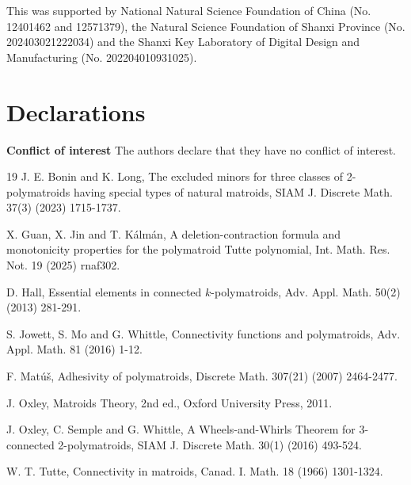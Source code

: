 \documentclass[preprint,10pt]{elsarticle}
\theoremstyle{plain}
\theoremstyle{definition}
\theoremstyle{remark}
\begin{document}
This  was supported by National Natural Science Foundation of China (No. 12401462 and 12571379), the Natural Science Foundation of Shanxi Province (No. 202403021222034) and the Shanxi Key Laboratory of Digital Design and Manufacturing (No. 202204010931025).

\section*{Declarations}
\noindent
{ \bf Conflict of interest}
The authors declare that they have no conflict of interest.

%
%
\begin{thebibliography}{19}
 J. E. Bonin and K. Long, The excluded minors for three classes of 2-polymatroids having special types of natural matroids, SIAM J. Discrete Math. 37(3) (2023) 1715-1737.


 X. Guan, X. Jin and T. K\'{a}lm\'{a}n, A deletion-contraction formula and monotonicity
properties for the polymatroid Tutte polynomial, Int. Math. Res. Not. 19 (2025) rnaf302.

 D. Hall, Essential elements in connected $k$-polymatroids, Adv. Appl. Math. 50(2) (2013) 281-291.

 S. Jowett, S. Mo and G. Whittle, Connectivity functions and polymatroids, Adv. Appl. Math. 81 (2016) 1-12.

 F. Mat\'{u}\v{s}, Adhesivity of polymatroids, Discrete Math. 307(21) (2007) 2464-2477.

 J. Oxley,  Matroids Theory, 2nd ed., Oxford University Press, 2011.

 J. Oxley, C. Semple and G. Whittle, A Wheels-and-Whirls Theorem for 3-connected 2-polymatroids, SIAM J. Discrete Math. 30(1) (2016) 493-524.

 W. T. Tutte, Connectivity in matroids, Canad. I. Math. 18 (1966) 1301-1324.
\end{thebibliography}
\end{document}

